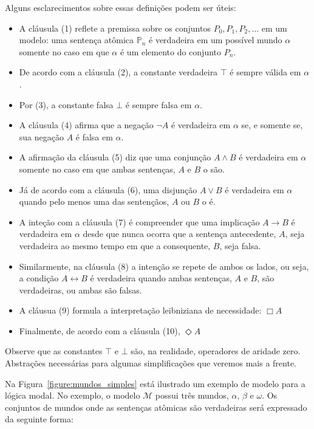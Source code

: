 Alguns esclarecimentos sobre essas definições podem ser úteis:
\begin{itemize}
    \item A cláusula (1) reflete a premissa sobre os conjuntos $P_0, P_1, P_2,
        \ldots$ em um modelo: uma sentença at\^omica $\mathbb{P}_n$ é verdadeira
        em um possível mundo $\alpha$ somente no caso em que $\alpha$ é um
        elemento do conjunto $P_n$.
    \item De acordo com a cláusula (2), a constante verdadeira $\top$ é sempre
        válida em $\alpha$.
    \item Por (3), a constante falsa $\bot$ é sempre falsa em $\alpha$.
    \item A cláusula (4) afirma que a negação $\neg A$ é verdadeira em $\alpha$
        se, e somente se, sua negação $A$ é falsa em $\alpha$.
    \item A afirmação da cláusula (5) diz que uma conjunção $A \wedge B$ é
        verdadeira em $\alpha$ somente no caso em que ambas sentenças, $A$ e
        $B$ o são.
    \item Já de acordo com a cláusula (6), uma disjunção $A \vee B$ é verdadeira
        em $\alpha$ quando pelo menos uma das sentençãos, $A$ ou $B$ o é.
    \item A inteção com a cláusula (7) é compreender que uma implicação $A \rightarrow
        B$ é verdadeira em $\alpha$ desde que nunca ocorra que a sentença antecedente,
        $A$, seja verdadeira ao mesmo tempo em que a consequente, $B$, seja
        falsa.
    \item Similarmente, na cláusula (8) a intenção se repete de ambos os lados,
        ou seja, a condição $A \leftrightarrow B$ é verdadeira quando ambas
        sentenças, $A$ e $B$, são verdadeiras, ou ambas são falsas.
    \item A cláusua (9) formula a interpretação leibniziana de necessidade:
        $\Box A$
    \item Finalmente, de acordo com a cláusula (10), $\Diamond A$
\end{itemize}

Observe que as constantes $\top$ e $\bot$ são, na realidade, operadores de
aridade zero. Abstrações necessárias para algumas simplificações que veremos
mais a frente.

Na Figura~\ref{figure:mundos_simples} está ilustrado um exemplo de modelo para a
lógica modal. No exemplo, o modelo $\mathcal{M}$ possui três mundos, $\alpha$,
$\beta$ e $\omega$. Os conjuntos de mundos onde as sentenças at\^omicas são
verdadeiras será expressado da seguinte forma:

